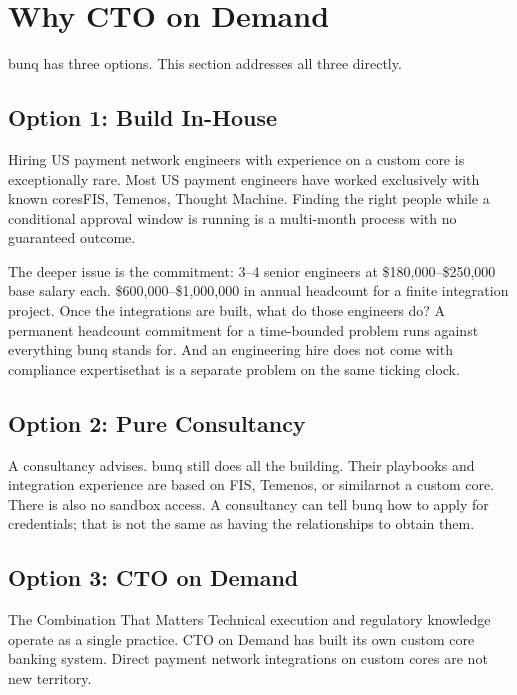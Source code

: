 
\section{Why CTO on Demand}

bunq has three options. This section addresses all three directly.

\subsection{Option 1: Build In-House}

Hiring US payment network engineers with experience on a custom core is exceptionally rare. Most US payment engineers have worked exclusively with known cores\dash FIS, Temenos, Thought Machine. Finding the right people while a conditional approval window is running is a multi-month process with no guaranteed outcome.

The deeper issue is the commitment: 3--4 senior engineers at \$180,000--\$250,000 base salary each. \$600,000--\$1,000,000 in annual headcount for a finite integration project. Once the integrations are built, what do those engineers do? A permanent headcount commitment for a time-bounded problem runs against everything bunq stands for. And an engineering hire does not come with compliance expertise\dash that is a separate problem on the same ticking clock.

\subsection{Option 2: Pure Consultancy}

A consultancy advises. bunq still does all the building. Their playbooks and integration experience are based on FIS, Temenos, or similar\dash not a custom core. There is also no sandbox access. A consultancy can tell bunq how to apply for credentials; that is not the same as having the relationships to obtain them.

\subsection{Option 3: CTO on Demand}

\begin{keyinsight}{The Combination That Matters}
Technical execution and regulatory knowledge operate as a single practice. CTO on Demand has built its own custom core banking system. Direct payment network integrations on custom cores are not new territory.
\end{keyinsight}

